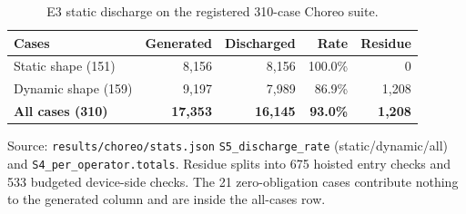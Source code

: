 \begin{table}[t]
\centering\footnotesize
\caption{E3 static discharge on the registered 310-case Choreo suite.}
\label{tab:e3-discharge}
\begin{tabular}{@{}lrrrr@{}}
\toprule
Cases & Generated & Discharged & Rate & Residue \\
\midrule
Static shape (151) & 8,156 & 8,156 & 100.0\% & 0 \\
Dynamic shape (159) & 9,197 & 7,989 & 86.9\% & 1,208 \\
\midrule
\textbf{All cases (310)} & \textbf{17,353} & \textbf{16,145} & \textbf{93.0\%} & \textbf{1,208} \\
\bottomrule
\end{tabular}
\vspace{0.4em}\begin{minipage}{0.98\linewidth}\raggedright\footnotesize Source: \texttt{results/choreo/stats.json} \texttt{S5\_discharge\_rate} (static/dynamic/all) and \texttt{S4\_per\_operator.totals}. Residue splits into 675 hoisted entry checks and 533 budgeted device-side checks. The 21 zero-obligation cases contribute nothing to the generated column and are inside the all-cases row.\end{minipage}
\end{table}
